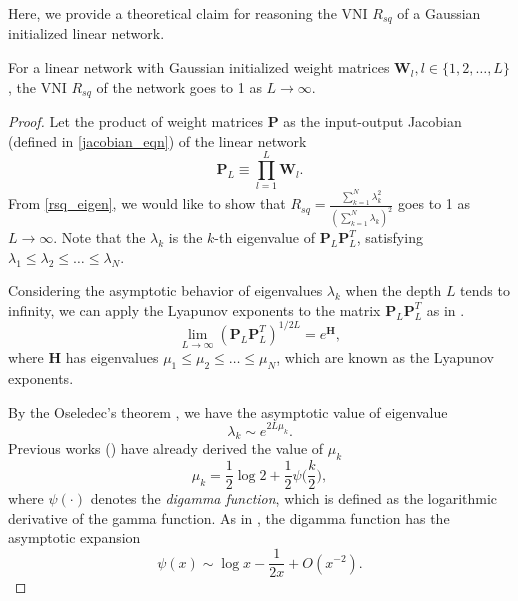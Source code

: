 Here, we provide a theoretical claim for reasoning the VNI $R_{sq}$ of a Gaussian initialized
linear network.

\begin{theorem}
    For a linear network with Gaussian initialized weight matrices
    $\mathbf{W}_l, l\in\{1, 2, \dots, L\}$, the VNI $R_{sq}$ of
    the network goes to 1 as $L\rightarrow\infty$.
    \label{matrix_prod}
\end{theorem}

\begin{proof}
    Let the product of weight matrices $\mathbf{P}$ as the input-output Jacobian
    (defined in \eqref{jacobian_eqn}) of the linear network
    \begin{equation}
        \mathbf{P}_L\equiv\prod_{l=1}^L\mathbf{W}_l.
        \label{prod_def}
    \end{equation}
    From \eqref{rsq_eigen}, we would like to show that
    $R_{sq}=\frac{\sum_{k=1}^N\lambda_k^2}{(\sum_{k=1}^N\lambda_k)^2}$
    goes to 1 as $L\rightarrow\infty$.
    Note that the $\lambda_k$ is the $k$-th eigenvalue of $\mathbf{P}_L\mathbf{P}_L^T$, satisfying
    $\lambda_1\leq\lambda_2\leq\dots\leq\lambda_N$.

    Considering the asymptotic behavior of eigenvalues $\lambda_k$ when the depth $L$ tends to
    infinity,
    we can apply the Lyapunov exponents to the matrix $\mathbf{P}_L\mathbf{P}_L^T$ as
    in \cite{prod_mat}.
    \begin{equation}
        \lim_{L\rightarrow\infty}(\mathbf{P}_L\mathbf{P}_L^T)^{1/2L}=e^\mathbf{H},
        \label{lyap_exp}
    \end{equation}
    where $\mathbf{H}$ has eigenvalues $\mu_1\leq\mu_2\leq\dots\leq\mu_N$, which are known as the
    Lyapunov exponents.

    By the Oseledec's theorem \cite{osel_thm}, we have the asymptotic value of eigenvalue
    \begin{equation}
        \lambda_k\sim e^{2L\mu_k}.
        \label{asym_eig}
    \end{equation}
    Previous works (\cite{prod_mat}) have already derived the value of $\mu_k$
    \begin{equation}
        \mu_k=\frac{1}{2}\log 2 + \frac{1}{2}\psi\Big(\frac{k}{2}\Big),
        \label{mu_result}
    \end{equation}
    where $\psi(\cdot)$ denotes the \textit{digamma function}, which is defined as the logarithmic
    derivative of the gamma function.
    As in \cite{digamma}, the digamma function has the asymptotic expansion
    \begin{equation}
        \psi(x)\sim\log x-\frac{1}{2x}+O(x^{-2}).
        \label{digamma_asym}
    \end{equation}


\end{proof}
